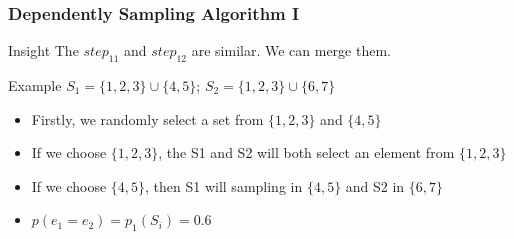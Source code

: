 \documentclass[notheorems, aspectratio=54]{beamer}
\begin{document}
\begin{frame}
    \frametitle{Dependently Sampling Algorithm I}
    \begin{block}{Insight}
        The $step_{11}$ and $step_{12}$ are similar. We can merge them.
    \end{block}
    \begin{block}{Example}
        $S_1 =  \{1,2,3\} \cup \{4,5\}$; $S_2 = \{1,2,3\} \cup \{6,7\}$
        \begin{itemize}
            \item Firstly, we randomly select a set from $\{1,2,3\}$ and $\{4,5\}$
            \item If we choose $\{1,2,3\}$, the S1 and S2 will both select an element from $\{1,2,3\}$
            \item If we choose $\{4,5\}$, then S1 will sampling in $\{4,5\}$ and S2 in $\{6,7\}$
            \item $p(e_1 = e_2) = p_1(S_i) = 0.6$
        \end{itemize}
    \end{block}
\end{frame}
\end{document}
